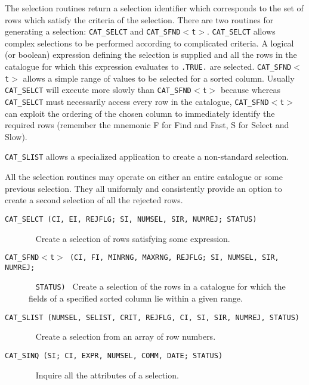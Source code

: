 \documentclass[11pt,twoside]{starlink}
\begin{document}
The selection routines return a selection identifier which corresponds
to the set of rows which satisfy the criteria of the selection. There
are two routines for generating a selection: \texttt{CAT\_SELCT} and
\texttt{CAT\_SFND$<$t$>$}. \texttt{CAT\_SELCT} allows complex selections to be
performed according to complicated criteria. A logical (or boolean)
expression defining the selection is supplied and all the rows in the
catalogue for which this expression evaluates to \texttt{.TRUE.} are
selected. \texttt{CAT\_SFND$<$t$>$} allows a simple range of values to be
selected for a sorted column. Usually \texttt{CAT\_SELCT} will execute
more slowly than \texttt{CAT\_SFND$<$t$>$} because whereas \texttt{CAT\_SELCT} must necessarily access every row in the catalogue,
\texttt{CAT\_SFND$<$t$>$} can exploit the ordering of the chosen column to
immediately identify the required rows (remember the mnemonic F for
Find and Fast, S for Select and Slow).

\texttt{CAT\_SLIST} allows a specialized application to create a non-standard
selection.

All the selection routines may operate on either an entire catalogue
or some previous selection. They all uniformly and consistently
provide an option to create a second selection of all the rejected rows.

\begin{description}

  \item[ \texttt{CAT\_SELCT (CI, EI, REJFLG; SI, NUMSEL, SIR, NUMREJ;
   STATUS) } ] ~
  \newline Create a selection of rows satisfying some expression.

  \item[ \texttt{CAT\_SFND$<$t$>$ (CI, FI, MINRNG, MAXRNG, REJFLG; SI,
   NUMSEL, SIR, NUMREJ; } ] ~
  \newline \texttt{STATUS) }
  \newline Create a selection of the rows in a catalogue for which the
   fields of a specified sorted column lie within a given range.

  \item[ \texttt{CAT\_SLIST (NUMSEL, SELIST, CRIT, REJFLG, CI, SI, SIR,
   NUMREJ, STATUS) } ] ~
  \newline Create a selection from an array of row numbers.

  \item[ \texttt{CAT\_SINQ (SI; CI, EXPR, NUMSEL, COMM, DATE; STATUS) } ] ~
  \newline Inquire all the attributes of a selection.

\end{description}
\end{document}
